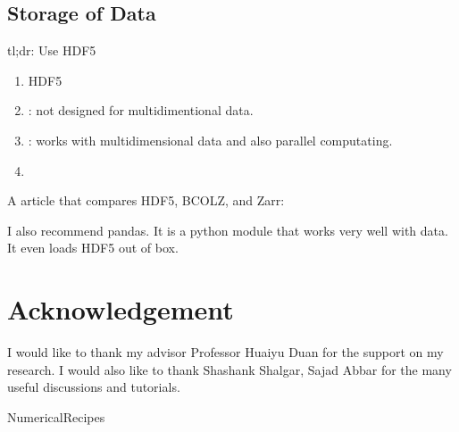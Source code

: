 \documentclass[letterpaper,12pt,english]{sphinxmanual}
\begin{document}
\section{Storage of Data}
\label{\detokenize{references/index:storage-of-data}}
tl;dr: Use HDF5
\begin{enumerate}
\item {} 
HDF5

\item {} 
 : not designed for multidimentional data.

\item {} 
 : works with multidimensional data and also parallel computating.

\item {} 

\end{enumerate}

A article that compares HDF5, BCOLZ, and Zarr:

I also recommend pandas. It is a python module that works very well with data. It even loads HDF5 out of box.


\chapter{Acknowledgement}
\label{\detokenize{acknowledgement::doc}}\label{\detokenize{acknowledgement:acknowledgement}}
I would like to thank my advisor Professor Huaiyu Duan for the support on my research. I would also like to thank Shashank Shalgar, Sajad Abbar for the many useful discussions and tutorials.

\begin{sphinxthebibliography}{NumericalRecipes}
\end{sphinxthebibliography}



\renewcommand{\indexname}{Index}
\printindex
\end{document}
